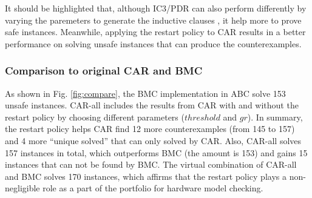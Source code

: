 It should be highlighted that, although IC3/PDR can also perform differently by varying the paremeters to generate the inductive clauses \cite{GR16}, it help more to prove safe instances. Meanwhile, applying the restart policy to CAR results in a better performance on solving unsafe instances that can produce the counterexamples. 

\subsubsection{Comparison to original CAR and BMC }
As shown in Fig. \ref{fig:compare}, the BMC implementation in ABC solve 153 unsafe instances. CAR-all includes the results from CAR with and without the restart policy by choosing different parameters ($threshold$ and $gr$). In summary, the restart policy helps CAR find 12 more counterexamples (from 145 to 157) and 4 more ``unique solved'' that can only solved by CAR. Also, CAR-all solves 157 instances in total, which outperforms BMC (the amount is 153) and gains 15 instances that can not be found by BMC. The virtual combination of CAR-all and BMC  solves 170 instances, which affirms that the restart policy plays a non-negligible role as a part of the portfolio for hardware model checking.
